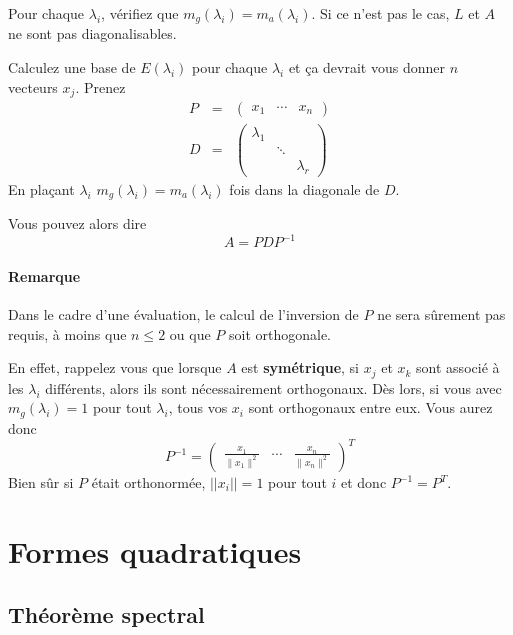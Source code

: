 Pour chaque $\lambda_i$, vérifiez que $m_g(\lambda_i) = m_a(\lambda_i)$. Si ce n'est pas le cas, $L$ et $A$ ne sont pas diagonalisables.

Calculez une base de $E(\lambda_i)$ pour chaque $\lambda_i$ et ça devrait vous donner $n$ vecteurs $x_j$.
Prenez
\begin{eqnarray*}
	P &=& \begin{pmatrix}x_1 & \cdots & x_n\end{pmatrix}\\
	D &=&
	\begin{pmatrix}
		\lambda_1 & &\\
		&\ddots&\\
		&&\lambda_r
	\end{pmatrix}
\end{eqnarray*}
En plaçant $\lambda_i$ $m_g(\lambda_i) = m_a(\lambda_i)$
fois dans la diagonale de $D$.

Vous pouvez alors dire
\[ A = PDP^{-1} \]

\paragraph{Remarque}
Dans le cadre d'une évaluation, le calcul de l'inversion de $P$ ne sera sûrement pas requis, à moins que $n \leq 2$ ou que $P$ soit orthogonale.

En effet, rappelez vous que lorsque $A$ est \textbf{symétrique}, si $x_j$ et $x_k$ sont associé à les $\lambda_i$ différents, alors ils sont nécessairement orthogonaux.
Dès lors, si vous avec $m_g(\lambda_i) = 1$ pour tout $\lambda_i$, tous vos $x_i$ sont orthogonaux entre eux.
Vous aurez donc
\[
  P^{-1} =
  \begin{pmatrix}
    \frac{x_1}{\|x_1\|^2} & \cdots & \frac{x_n}{\|x_n\|^2}
  \end{pmatrix}^T
\]
Bien sûr si $P$ était orthonormée, $||x_i|| = 1$ pour tout $i$ et
donc $P^{-1} = P^T$.


\section{Formes quadratiques}

\subsection{Théorème spectral}

